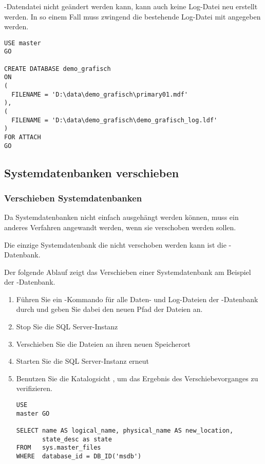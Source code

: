           -Datendatei nicht geändert werden kann, kann auch
          keine Log-Datei neu erstellt werden. In so einem Fall muss zwingend
          die bestehende Log-Datei mit angegeben werden.
          \begin{lstlisting}[language=ms_sql,caption={Anfügen der
          schreibgeschützten Datenbank demo\_grafisch},label=admin03_22]
USE master 
GO

CREATE DATABASE demo_grafisch
ON 
(
  FILENAME = 'D:\data\demo_grafisch\primary01.mdf'
),
(
  FILENAME = 'D:\data\demo_grafisch\demo_grafisch_log.ldf'
)
FOR ATTACH
GO
          \end{lstlisting}    
          \begin{literaturinternet}
            \item \cite{ms190794}
          \end{literaturinternet}
      \subsection{Systemdatenbanken verschieben}
        \subsubsection{Verschieben Systemdatenbanken}
          Da Systemdatenbanken nicht einfach ausgehängt werden können, muss ein
          anderes Verfahren angewandt werden, wenn sie verschoben werden
          sollen.
          \begin{merke}
            Die einzige Systemdatenbank die nicht verschoben werden kann ist die
            -Datenbank.
          \end{merke}
          Der folgende Ablauf zeigt das Verschieben einer Systemdatenbank am
          Beispiel der -Datenbank.
          \begin{enumerate}
              \item Führen Sie ein -Kommando für alle Daten- und Log-Dateien der
              -Datenbank durch und geben Sie dabei den neuen
              Pfad der Dateien an.
              \item Stop Sie die SQL Server-Instanz
              \item Verschieben Sie die Dateien an ihren neuen Speicherort
              \item Starten Sie die SQL Server-Instanz erneut
              \item Benutzen Sie die Katalogsicht
              , um das Ergebnis des
              Verschiebevorganges zu verifizieren.
                \begin{lstlisting}[language=ms_sql,caption={Abfragen
                der View \identifier{sys.master\_files}},label=admin03_23]
USE
master GO

SELECT name AS logical_name, physical_name AS new_location, 
       state_desc as state
FROM   sys.master_files
WHERE  database_id = DB_ID('msdb')
                \end{lstlisting}
          \end{enumerate}
